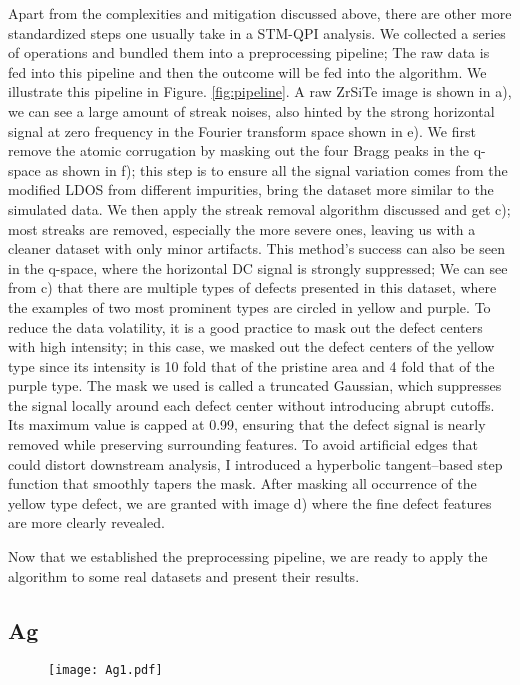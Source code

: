 Apart from the complexities and mitigation discussed above, there are other more standardized steps one usually take in a STM-QPI analysis. We collected a series of operations and bundled them into a preprocessing pipeline; The raw data is fed into this pipeline and then the outcome will be fed into the algorithm. We illustrate this pipeline in Figure. \ref{fig:pipeline}. A raw ZrSiTe image is shown in a), we can see a large amount of streak noises, also hinted by the strong horizontal signal at zero frequency in the Fourier transform space shown in e). We first remove the atomic corrugation by masking out the four Bragg peaks in the q-space as shown in f); this step is to ensure all the signal variation comes from the modified \ac{LDOS} from different impurities, bring the dataset more similar to the simulated data. We then apply the streak removal algorithm discussed and get c); most streaks are removed, especially the more severe ones, leaving us with a cleaner dataset with only minor artifacts. This method's success can also be seen in the q-space, where the horizontal DC signal is strongly suppressed; We can see from c) that there are multiple types of defects presented in this dataset, where the examples of two most prominent types are circled in yellow and purple. To reduce the data volatility, it is a good practice to mask out the defect centers with high intensity; in this case, we masked out the defect centers of the yellow type since its intensity is 10 fold that of the pristine area and 4 fold that of the purple type. The mask we used is called a truncated Gaussian, which suppresses the signal locally around each defect center without introducing abrupt cutoffs. Its maximum value is capped at 0.99, ensuring that the defect signal is nearly removed while preserving surrounding features. To avoid artificial edges that could distort downstream analysis, I introduced a hyperbolic tangent–based step function that smoothly tapers the mask. After masking all occurrence of the yellow type defect, we are granted with image d) where the fine defect features are more clearly revealed. 

Now that we established the preprocessing pipeline, we are ready to apply the algorithm to some real datasets and present their results.

\subsection{Ag}

\begin{figure}
	\texttt{[image: Ag1.pdf]} 
	\centering
	\caption{}
	\label{fig:Ag1}
\end{figure}

